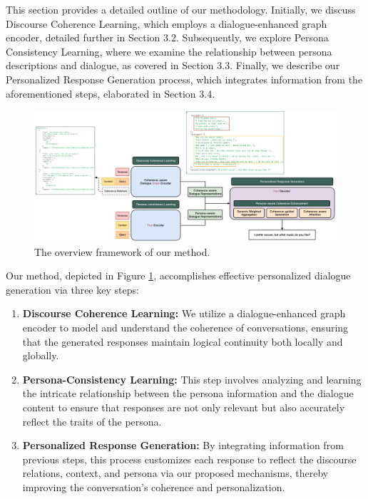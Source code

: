 This section provides a detailed outline of our methodology. Initially, we discuss Discourse Coherence Learning, which employs a dialogue-enhanced graph encoder, detailed further in Section 3.2. Subsequently, we explore Persona Consistency Learning, where we examine the relationship between persona descriptions and dialogue, as covered in Section 3.3. Finally, we describe our Personalized Response Generation process, which integrates information from the aforementioned steps, elaborated in Section 3.4.

\begin{figure}[ht]
    \centering
    \includegraphics[width=1.00\textwidth]{./context/methodology/images/methodology_arch-v2.pdf}
    \caption{The overview framework of our method.}
    \label{fig:proposed_method_overview}
\end{figure}

Our method, depicted in Figure \ref{fig:proposed_method_overview}, accomplishes effective personalized dialogue generation via three key steps:

\begin{enumerate}
    \item \textbf{Discourse Coherence Learning:} We utilize a dialogue-enhanced graph encoder to model and understand the coherence of conversations, ensuring that the generated responses maintain logical continuity both locally and globally.

    \item \textbf{Persona-Consistency Learning:} This step involves analyzing and learning the intricate relationship between the persona information and the dialogue content to ensure that responses are not only relevant but also accurately reflect the traits of the persona.

    \item \textbf{Personalized Response Generation:} By integrating information from previous steps, this process customizes each response to reflect the discourse relations, context, and persona via our proposed mechanisms, thereby improving the conversation's coherence and personalization.
\end{enumerate}

